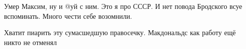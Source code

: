 \begin{itemize}
Умер Максим, ну и @уй с ним. Это я про СССР. И нет повода Бродского всуе вспоминать. Много чести себе возомнили.

 
Хватит пиарить эту сумасшедшую правосечку. Макдональдс как работу ещё никто не отменял

\end{itemize} %

